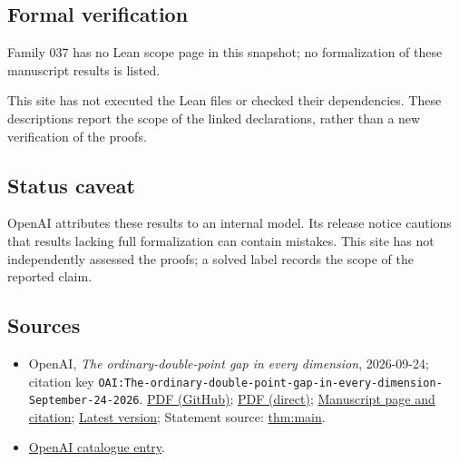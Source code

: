 \documentclass[11pt]{article}
\begin{document}
\subsection{Formal verification}
Family 037 has no Lean scope page in this snapshot; no formalization of these manuscript results is listed.

This site has not executed the Lean files or checked their dependencies. These descriptions report the scope of the linked declarations, rather than a new verification of the proofs.

\subsection{Status caveat}
OpenAI attributes these results to an internal model. Its release notice cautions that results lacking full formalization can contain mistakes. This site has not independently assessed the proofs; a solved label records the scope of the reported claim.

\subsection{Sources}
\begin{itemize}
\item OpenAI, \emph{The ordinary-double-point gap in every dimension}, 2026-09-24; citation key \texttt{OAI:The-ordinary-double-point-gap-in-every-dimension-September-24-2026}. \href{https://github.com/openai/math/blob/adc7f1241b42e322a6451854ab7e4b4c146bf78a/preprints/The-ordinary-double-point-gap-in-every-dimension-September-24-2026/paper.pdf}{PDF (GitHub)}; \href{https://github.com/openai/math/raw/adc7f1241b42e322a6451854ab7e4b4c146bf78a/preprints/The-ordinary-double-point-gap-in-every-dimension-September-24-2026/paper.pdf}{PDF (direct)}; \href{https://github.com/openai/math/blob/adc7f1241b42e322a6451854ab7e4b4c146bf78a/preprints/The-ordinary-double-point-gap-in-every-dimension-September-24-2026/README.md}{Manuscript page and citation}; \href{https://github.com/openai/math/blob/main/preprints/The-ordinary-double-point-gap-in-every-dimension-September-24-2026/paper.pdf}{Latest version}; Statement source: \href{https://github.com/openai/math/blob/adc7f1241b42e322a6451854ab7e4b4c146bf78a/preprints/The-ordinary-double-point-gap-in-every-dimension-September-24-2026/build/sections/01-introduction.tex\#L33}{thm:main}.
\item \href{https://github.com/openai/math/blob/adc7f1241b42e322a6451854ab7e4b4c146bf78a/CONTENTS.md}{OpenAI catalogue entry}.
\end{itemize}
\end{document}
